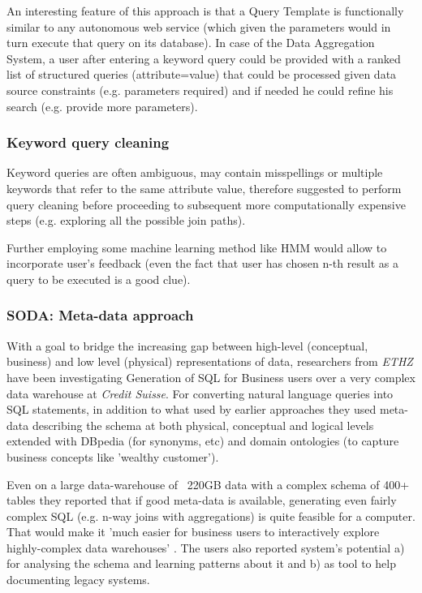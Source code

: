 An interesting feature of this approach is that a Query Template is functionally similar to any autonomous web service (which given the parameters would in turn execute that query on its database).  In case of the Data Aggregation System, a user after entering a keyword query could be provided with a ranked list of structured queries (attribute=value) that could be processed given data source constraints (e.g. parameters required) and if needed he could refine his search (e.g. provide more parameters).


\subsubsection*{Keyword query cleaning}
Keyword queries are often ambiguous, may contain misspellings or multiple keywords that refer to the same attribute value,  therefore \cite{kw_cleaning} suggested to perform query cleaning before proceeding to subsequent more computationally expensive steps (e.g. exploring all the possible join paths).

Further employing some machine learning method like HMM\cite{kw_cleaning_hmm} would allow to incorporate user's feedback (even the fact that user has chosen n-th result as a query to be executed is a good clue).


\subsubsection*{SODA: Meta-data approach}

With a goal to bridge the increasing gap between high-level (conceptual, business) and low level (physical) representations of data, researchers from \textit{ETHZ} have been investigating Generation of SQL for Business users over a very complex data warehouse at \textit{Credit Suisse}.  For converting natural language queries 
 into SQL statements, in addition to what used by earlier approaches they used meta-data describing the schema at both physical, conceptual and logical levels extended with DBpedia (for synonyms, etc) and domain ontologies (to capture business concepts like 'wealthy customer').

Even on a large data-warehouse of ~220GB data with a complex schema of 400+ tables they reported that if good meta-data is available, generating even fairly complex SQL  (e.g. n-way joins with aggregations) is quite feasible for a computer. That would make it 'much easier for business users to interactively explore highly-complex data warehouses' \cite[p.932]{ethz2012}. The users also reported system's potential a) for analysing the schema and learning patterns about it and b) as tool to help documenting legacy systems.


